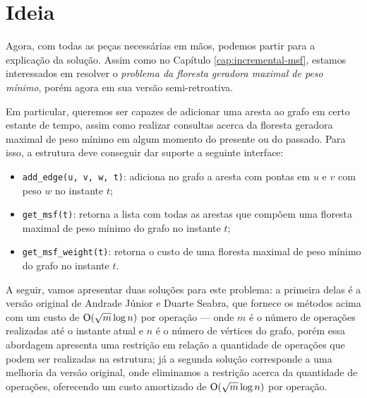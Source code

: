 \section{Ideia}
\label{sec:rmsf-ideia}


Agora, com todas as peças necessárias em mãos, podemos partir para a explicação da solução. Assim como no Capítulo \ref{cap:incremental-msf}, estamos interessados em resolver o \emph{problema da floresta geradora maximal de peso mínimo}, porém agora em sua versão semi-retroativa.

Em particular, queremos ser capazes de adicionar uma aresta ao grafo em certo estante de tempo, assim como realizar consultas acerca da floresta geradora maximal de peso mínimo em algum momento do presente ou do passado. Para isso, a estrutura deve conseguir dar suporte a seguinte interface:

\begin{itemize}
    \item \texttt{add\_edge(u, v, w, t)}: adiciona no grafo a aresta com pontas em $u$ e $v$ com peso $w$ no instante $t$;
    \item \texttt{get\_msf(t)}: retorna a lista com todas as arestas que compõem uma floresta maximal de peso mínimo do grafo no instante $t$;
    \item \texttt{get\_msf\_weight(t)}: retorna o custo de uma floresta maximal de peso mínimo do grafo no instante $t$.
\end{itemize}

A seguir, vamos apresentar duas soluções para este problema: a primeira delas é a versão original de Andrade Júnior e Duarte Seabra, que fornece os métodos acima com um custo de $\mathrm{O}(\sqrt m \log n)$ por operação --- onde $m$ é o número de operações realizadas até o instante atual e $n$ é o número de vértices do grafo, porém essa abordagem apresenta uma restrição em relação a quantidade de operações que podem ser realizadas na estrutura; já a segunda solução corresponde a uma melhoria da versão original, onde eliminamos a restrição acerca da quantidade de operações, oferecendo um custo amortizado de $\mathrm{O}(\sqrt m \log n)$ por operação.


